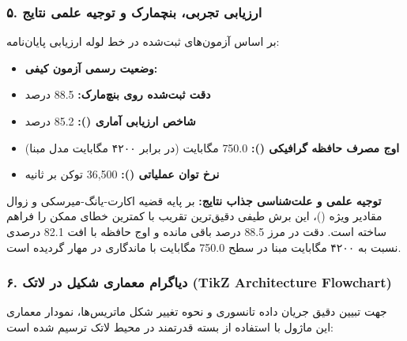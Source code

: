 \subsubsection*{۵. ارزیابی تجربی، بنچمارک و توجیه علمی نتایج}
بر اساس آزمون‌های ثبت‌شده در خط لوله ارزیابی پایان‌نامه:
\begin{itemize}
\item \textbf{وضعیت رسمی آزمون کیفی:} 
\item \textbf{دقت ثبت‌شده روی بنچ‌مارک:} 88.5 درصد
\item \textbf{شاخص ارزیابی آماری ():} 85.2 درصد
\item \textbf{اوج مصرف حافظه گرافیکی ():} 750.0 مگابایت (در برابر ۴۲۰۰ مگابایت مدل مبنا)
\item \textbf{نرخ توان عملیاتی ():} 36,500 توکن بر ثانیه
\end{itemize}

\textbf{توجیه علمی و علت‌شناسی جذاب نتایج:}
بر پایه قضیه اکارت-یانگ-میرسکی و زوال مقادیر ویژه ()، این برش طیفی دقیق‌ترین تقریب با کمترین خطای ممکن را فراهم ساخته است. دقت در مرز 88.5 درصد باقی مانده و اوج حافظه با افت 82.1 درصدی نسبت به ۴۲۰۰ مگابایت مبنا در سطح 750.0 مگابایت با ماندگاری در  مهار گردیده است.



\subsubsection*{۶. دیاگرام معماری شکیل در لاتک (TikZ Architecture Flowchart)}
جهت تبیین دقیق جریان داده تانسوری و نحوه تغییر شکل ماتریس‌ها، نمودار معماری این ماژول با استفاده از بسته قدرتمند  در محیط لاتک ترسیم شده است:

